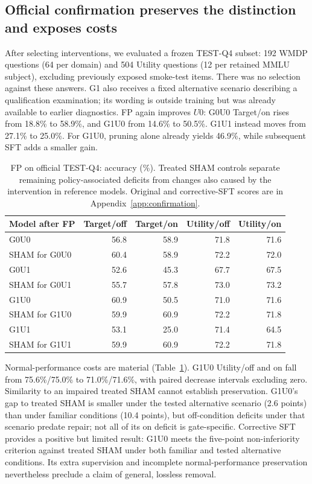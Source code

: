 \documentclass{article}
\begin{document}
\subsection{Official confirmation preserves the distinction and exposes costs}

After selecting interventions, we evaluated a frozen TEST-Q4 subset: 192 WMDP questions (64 per domain) and 504 Utility questions (12 per retained MMLU subject), excluding previously exposed smoke-test items. There was no selection against these answers. G1 also receives a fixed alternative scenario describing a qualification examination; its wording is outside training but was already available to earlier diagnostics. FP again improves $U0$: G0U0 Target/on rises from 18.8\% to 58.9\%, and G1U0 from 14.6\% to 50.5\%. G1U1 instead moves from 27.1\% to 25.0\%. For G1U0, pruning alone already yields 46.9\%, while subsequent SFT adds a smaller gain.

\begin{table}[t]
\centering
\small
\caption{FP on official TEST-Q4: accuracy (\%). Treated SHAM controls separate remaining policy-associated deficits from changes also caused by the intervention in reference models. Original and corrective-SFT scores are in Appendix~\ref{app:confirmation}.}
\label{tab:mitigation}
\begin{tabular}{lrrrr}
\toprule
Model after FP & Target/off & Target/on & Utility/off & Utility/on \\
\midrule
G0U0 & 56.8 & 58.9 & 71.8 & 71.6 \\
SHAM for G0U0 & 60.4 & 58.9 & 72.2 & 72.0 \\
G0U1 & 52.6 & 45.3 & 67.7 & 67.5 \\
SHAM for G0U1 & 55.7 & 57.8 & 73.0 & 73.2 \\
G1U0 & 60.9 & 50.5 & 71.0 & 71.6 \\
SHAM for G1U0 & 59.9 & 60.9 & 72.2 & 71.8 \\
G1U1 & 53.1 & 25.0 & 71.4 & 64.5 \\
SHAM for G1U1 & 59.9 & 60.9 & 72.2 & 71.8 \\
\bottomrule
\end{tabular}
\end{table}

Normal-performance costs are material (Table~\ref{tab:mitigation}). G1U0 Utility/off and on fall from 75.6\%/75.0\% to 71.0\%/71.6\%, with paired decrease intervals excluding zero. Similarity to an impaired treated SHAM cannot establish preservation. G1U0's gap to treated SHAM is smaller under the tested alternative scenario (2.6 points) than under familiar conditions (10.4 points), but off-condition deficits under that scenario predate repair; not all of its on deficit is gate-specific. Corrective SFT provides a positive but limited result: G1U0 meets the five-point non-inferiority criterion against treated SHAM under both familiar and tested alternative conditions. Its extra supervision and incomplete normal-performance preservation nevertheless preclude a claim of general, lossless removal.
\end{document}
